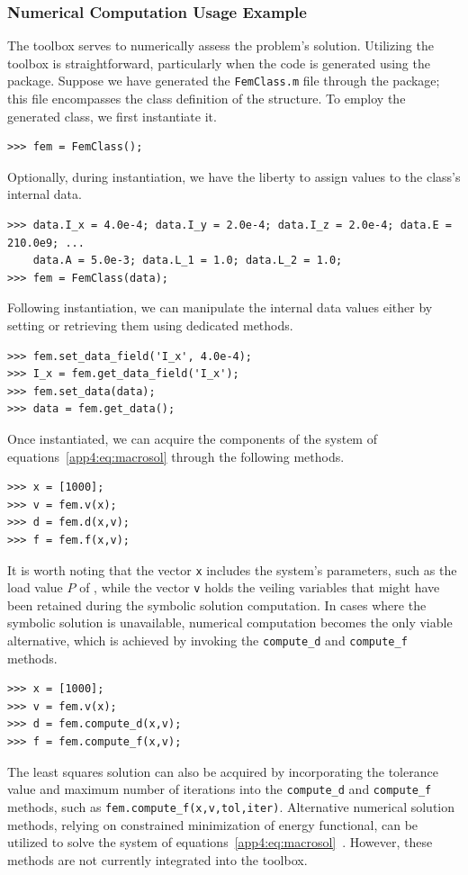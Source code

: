 \subsubsection{Numerical Computation Usage Example}

The \TrussMe{} \Matlab{} toolbox serves to numerically assess the problem's solution. Utilizing the toolbox is straightforward, particularly when the code is generated using the \TrussMe{} \Maple{} package. Suppose we have generated the \texttt{FemClass.m} file through the \TrussMe{} \Maple{} package; this file encompasses the class definition of the structure. To employ the generated class, we first instantiate it.
%
\begin{verbatim}
>>> fem = FemClass();
\end{verbatim}
%
Optionally, during instantiation, we have the liberty to assign values to the class's internal data.
%
\begin{verbatim}
>>> data.I_x = 4.0e-4; data.I_y = 2.0e-4; data.I_z = 2.0e-4; data.E = 210.0e9; ...
    data.A = 5.0e-3; data.L_1 = 1.0; data.L_2 = 1.0;
>>> fem = FemClass(data);
\end{verbatim}
%
Following instantiation, we can manipulate the internal data values either by setting or retrieving them using dedicated methods.
%
\begin{verbatim}
>>> fem.set_data_field('I_x', 4.0e-4);
>>> I_x = fem.get_data_field('I_x');
>>> fem.set_data(data);
>>> data = fem.get_data();
\end{verbatim}
%
Once instantiated, we can acquire the components of the system of equations~\eqref{app4:eq:macrosol} through the following methods.
%
\begin{verbatim}
>>> x = [1000];
>>> v = fem.v(x);
>>> d = fem.d(x,v);
>>> f = fem.f(x,v);
\end{verbatim}
%
It is worth noting that the vector \texttt{x} includes the system's parameters, such as the load value $P$ of , while the vector \texttt{v} holds the veiling variables that might have been retained during the symbolic solution computation. In cases where the symbolic solution is unavailable, numerical computation becomes the only viable alternative, which is achieved by invoking the \texttt{compute\_d} and \texttt{compute\_f} methods.
%
\begin{verbatim}
>>> x = [1000];
>>> v = fem.v(x);
>>> d = fem.compute_d(x,v);
>>> f = fem.compute_f(x,v);
\end{verbatim}
%
The least squares solution can also be acquired by incorporating the tolerance value and maximum number of iterations into the \texttt{compute\_d} and \texttt{compute\_f} methods, such as \texttt{fem.compute\_f(x,v,tol,iter)}. Alternative numerical solution methods, relying on constrained minimization of energy functional, can be utilized to solve the system of equations~\eqref{app4:eq:macrosol}~\cite{hutton2004fundamentals}. However, these methods are not currently integrated into the \TrussMe{} \Matlab{} toolbox.

